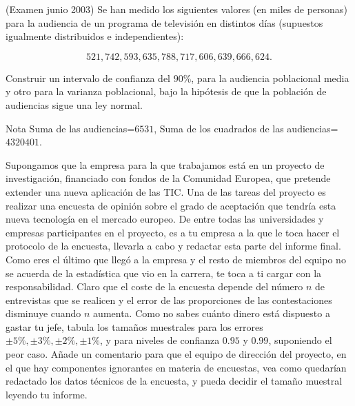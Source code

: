 \documentclass[12pt]{article}\usepackage[]{graphicx}\usepackage[]{color}
\begin{document}
\begin{prob}(Examen junio 2003) Se han medido los siguientes valores (en miles de personas) para la audiencia de un
programa de televisión en distintos días (supuestos igualmente distribuidos e
independientes):

$$521, 742, 593, 635, 788, 717, 606, 639, 666, 624.$$

Construir un intervalo de confianza del $90$\%, para la audiencia poblacional media y otro
para la varianza poblacional, bajo la hipótesis de que la población de audiencias sigue una
ley normal.

Nota Suma de las audiencias=$6531$, Suma de los cuadrados de las audiencias=$4320401$.
\end{prob}

\begin{prob}
Supongamos que la empresa para la que trabajamos está en un proyecto de investigación,
financiado con fondos de la Comunidad Europea, que pretende extender una nueva aplicación
de las TIC. Una de las tareas del proyecto es realizar una encuesta de opinión sobre el
grado de aceptación que tendría esta nueva tecnología en el mercado europeo. De entre todas
las universidades y empresas participantes en el proyecto, es a tu empresa a la que le toca
hacer el protocolo de la encuesta, llevarla a cabo y redactar esta parte del informe final.
Como eres el último que llegó a la empresa y el resto de miembros del equipo no se acuerda
de la estadística que vio en la carrera, te toca a ti cargar con la responsabilidad. Claro
que el coste de la encuesta depende del número $n$ de entrevistas que se realicen y el
error de las proporciones de las contestaciones disminuye cuando $n$ aumenta. Como no sabes
cuánto dinero está dispuesto a gastar tu jefe, tabula los tamaños muestrales para los
errores $\pm 5\%, \pm 3\%, \pm 2\%,\pm 1\%$, y para niveles de confianza $0.95$ y $0.99$,
suponiendo el peor caso. Añade un comentario para que el equipo de dirección del proyecto,
en el que hay componentes ignorantes en  materia de encuestas, vea como quedarían redactado
los datos técnicos de la encuesta, y pueda decidir  el tamaño muestral leyendo tu informe.
\end{prob}
\end{document}
